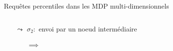 \documentclass[compress]{beamer}
\theoremstyle{theorem}%
\begin{document}
\begin{frame}{Requêtes percentiles dans les MDP multi-dimensionnels}
\begin{center}
\begin{columns}
\begin{column}{0.6\linewidth}
{\begin{itemize}
            \item[$\leadsto$] $\sigma_2 : $ envoi par un noeud intermédiaire
            \begin{itemize}
              \item[$\implies$] 
          \end{itemize}
        \end{itemize}
        }
      \end{column}
    \end{columns}
  \end{center}

\end{frame}
\end{document}
